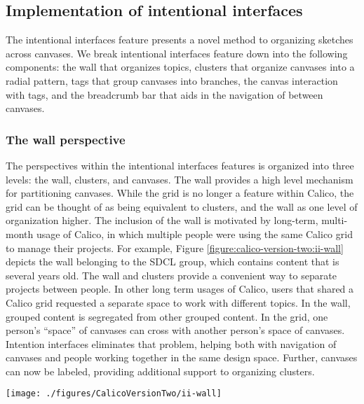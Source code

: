 \subsection{Implementation of intentional interfaces}

The intentional interfaces feature presents a novel method to organizing sketches across canvases. We break intentional interfaces feature down into the following components: the wall that organizes topics, clusters that organize canvases into a radial pattern, tags that group canvases into branches, the canvas interaction with tags, and the breadcrumb bar that aids in the navigation of between canvases.

\subsubsection{The wall perspective} 

The perspectives within the intentional interfaces features is organized into three levels: the wall, clusters, and canvases. The wall provides a high level mechanism for partitioning canvases.  While the grid is no longer a feature within Calico, the grid can be thought of as being equivalent to clusters, and the wall as one level of organization higher. The inclusion of the wall is motivated by long-term, multi-month usage of Calico, in which multiple people were using the same Calico grid to manage their projects. For example, Figure \ref{figure:calico-version-two:ii-wall} depicts the wall belonging to the SDCL group, which contains content that is several years old. The wall and clusters provide a convenient way to separate projects between people. In other long term usages of Calico, users that shared a Calico grid requested a separate space to work with different topics. In the wall, grouped content is segregated from other grouped content. In the grid, one person's ``space'' of canvases can cross with another person’s space of canvases. Intention interfaces eliminates that problem, helping both with navigation of canvases and people working together in the same design space. Further, canvases can now be labeled, providing additional support to organizing clusters. 

\begin{figure*}[tbh]
  \centering
  \texttt{[image: ./figures/CalicoVersionTwo/ii-wall]}
  \caption{The Calico wall belonging to the SDCL group, which contains sketches that are several years old and are used by several group members regularly.}
  \label{figure:calico-version-two:ii-wall}
\end{figure*}

